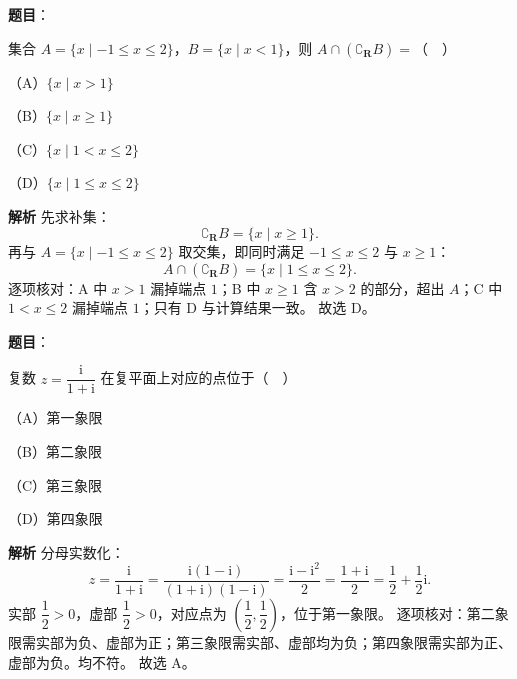 \begin{answer}

\textbf{题目}：

集合 $A=\{x\mid -1\leqslant x\leqslant 2\}$，$B=\{x\mid x<1\}$，则 $A\cap(\complement_{\mathbf R}B)=$（　）

（A）$\{x\mid x>1\}$

（B）$\{x\mid x\geqslant 1\}$

（C）$\{x\mid 1<x\leqslant 2\}$

（D）$\{x\mid 1\leqslant x\leqslant 2\}$

\textbf{解析}
先求补集：
\nopagebreak[4]
\[\complement_{\mathbf R}B=\{x\mid x\geqslant 1\}.\]
再与 $A=\{x\mid -1\leqslant x\leqslant 2\}$ 取交集，即同时满足 $-1\leqslant x\leqslant 2$ 与 $x\geqslant 1$：
\nopagebreak[4]
\[A\cap(\complement_{\mathbf R}B)=\{x\mid 1\leqslant x\leqslant 2\}.\]
逐项核对：A 中 $x>1$ 漏掉端点 $1$；B 中 $x\geqslant 1$ 含 $x>2$ 的部分，超出 $A$；C 中 $1<x\leqslant 2$ 漏掉端点 $1$；只有 D 与计算结果一致。
故选 D。


\end{answer}
\begin{answer}

\textbf{题目}：

复数 $z=\dfrac{\mathrm i}{1+\mathrm i}$ 在复平面上对应的点位于（　）

（A）第一象限

（B）第二象限

（C）第三象限

（D）第四象限

\textbf{解析}
分母实数化：
\nopagebreak[4]
\[z=\frac{\mathrm i}{1+\mathrm i}=\frac{\mathrm i(1-\mathrm i)}{(1+\mathrm i)(1-\mathrm i)}=\frac{\mathrm i-\mathrm i^2}{2}=\frac{1+\mathrm i}{2}=\frac12+\frac12\mathrm i.\]
实部 $\dfrac12>0$，虚部 $\dfrac12>0$，对应点为 $\left(\dfrac12,\dfrac12\right)$，位于第一象限。
逐项核对：第二象限需实部为负、虚部为正；第三象限需实部、虚部均为负；第四象限需实部为正、虚部为负。均不符。
故选 A。


\end{answer}
